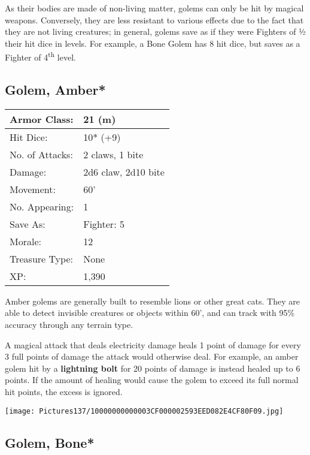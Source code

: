 \documentclass[a4paper,twoside,openany,10pt]{book}
\begin{document}
\begin{multicols}{2}
As their bodies are made of non-living matter, golems can only be hit by magical weapons. Conversely, they are less resistant to various effects due to the fact that they are not living creatures; in general, golems save as if they were Fighters of ½ their hit dice in levels. For example, a Bone Golem has 8 hit dice, but saves as a Fighter of 4\textsuperscript{th} level.

\subsection*{Golem, Amber*}\label{golem-amber}

\begin{tabularx}{0.48\textwidth}{@{}lX@{}}
Armor Class: & 21 (m) \\\hline
Hit Dice: & 10* (+9) \\\hline
No. of Attacks: & 2 claws, 1 bite \\\hline
Damage: & 2d6 claw, 2d10 bite \\\hline
Movement: & 60' \\\hline
No. Appearing: & 1 \\\hline
Save As: & Fighter: 5 \\\hline
Morale: & 12 \\\hline
Treasure Type: & None \\\hline
XP: & 1,390 \\\hline
\end{tabularx}\medskip



Amber golems are generally built to resemble lions or other great cats. They are able to detect invisible creatures or objects within 60', and can track with 95\% accuracy through any terrain type.

A magical attack that deals electricity damage heals 1 point of damage for every 3 full points of damage the attack would otherwise deal. For example, an amber golem hit by a \textbf{lightning bolt} for 20 points of damage is instead healed up to 6 points. If the amount of healing would cause the golem to exceed its full normal hit points, the excess is ignored.


\begin{center}
	\texttt{[image: Pictures137/10000000000003CF000002593EED082E4CF80F09.jpg]}
\end{center}

\columnbreak


\subsection*{Golem, Bone*}\label{golem-bone}



\end{multicols}
\end{document}
